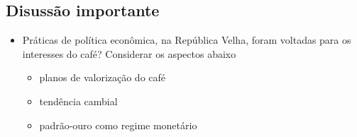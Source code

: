 \documentclass[a4paper,12pt]{article}[abntex2]
\begin{document}
\subsection{\textbf{Disussão importante}}
\begin{itemize}
    \item Práticas de política econômica, na República Velha, foram voltadas para os interesses do café? Considerar os aspectos abaixo
    \begin{itemize}
        \item planos de valorização do café
    \end{itemize}
    \begin{itemize}
        \item  tendência cambial
    \end{itemize}
    \begin{itemize}
        \item  padrão-ouro como regime monetário
    \end{itemize}
\end{itemize}
\end{document}
